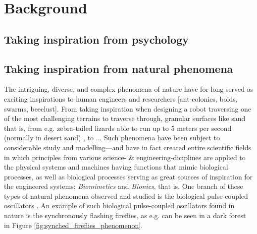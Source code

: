 \chapter{Background}
\label{chap:background}




 \nl



\section{Taking inspiration from psychology}




 \nl






\section{Taking inspiration from natural phenomena}
The intriguing, diverse, and complex phenomena of nature have for long served as exciting inspirations to human engineers and researchers [ant-colonies, boids, swarms, beeclust]. From taking inspiration when designing a robot traversing one of the most challenging terrains to traverse through, granular surfaces like sand that is, from e.g. zebra-tailed lizards able to run up to 5 meters per second (normally in desert sand) \cite{sandbots}, to ... Such phenomena have been subject to considerable study and modelling—and have in fact created entire scientific fields \cite{biomimetics, bionics} in which principles from various science- \& engineering-diciplines are applied to the physical systems and machines having functions that mimic biological processes, as well as biological processes serving as great sources of inspiration for the engineered systems; \textit{Biomimetics} and \textit{Bionics}, that is. One branch of these types of natural phenomena observed and studied is the biological pulse-coupled oscillators \cite{russerMinimalAssumptionsReferanser}. An example of such biological pulse-coupled oscillators found in nature is the synchronously flashing fireflies, as e.g. can be seen in a dark forest in Figure \ref{fig:synched_fireflies_phenomenon}.

